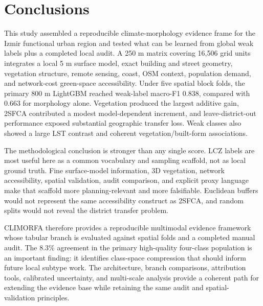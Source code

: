 \section{Conclusions}\label{sec:conclusions}

This study assembled a reproducible climate-morphology evidence frame for the
Izmir functional urban region and tested what can be learned from global weak
labels plus a completed local audit. A 250 m matrix covering 16,506 grid units
integrates a
local 5 m surface model, exact building and street geometry, vegetation
structure, remote sensing, coast, OSM context, population demand, and
network-cost green-space accessibility. Under five spatial block folds, the
primary 800 m LightGBM reached weak-label macro-F1 0.838, compared with 0.663
for morphology alone. Vegetation produced the largest additive gain, 2SFCA
contributed a modest model-dependent increment, and leave-district-out
performance exposed substantial geographic transfer loss. Weak classes also
showed a large LST contrast and coherent vegetation/built-form associations.

The methodological conclusion is stronger than any single score. LCZ labels are
most useful here as a common vocabulary and sampling scaffold, not as local
ground truth. Fine surface-model information, 3D vegetation, network
accessibility, spatial validation, audit comparison, and explicit proxy language
make that scaffold more planning-relevant and more falsifiable. Euclidean buffers would not represent
the same accessibility construct as 2SFCA, and random splits would not reveal
the district transfer problem.

CLIMORFA therefore provides a reproducible multimodal evidence framework whose
tabular branch is evaluated against spatial folds and a completed manual audit.
The 8.3\% agreement in the primary high-quality four-class population is an
important finding: it identifies class-space compression that should inform
future local subtype work. The architecture, branch comparisons, attribution
tools, calibrated uncertainty, and multi-scale analysis provide a coherent path
for extending the evidence base while retaining the same audit and spatial-
validation principles.
